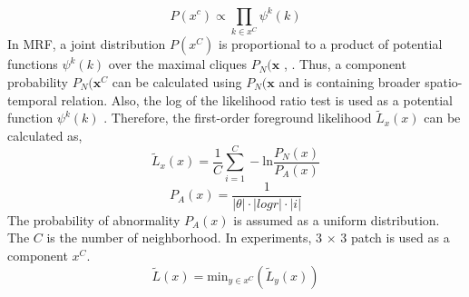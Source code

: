 \documentclass[conference]{IEEEtran}
\begin{document}
\begin{equation}\label{eq:90}
  P(x^c) \propto \prod_{k \in x^C} \psi ^k (k)
\end{equation}
In MRF, a joint distribution \begin{math} P(x^C) \end{math}  is proportional to a product of potential functions \begin{math} \psi^k(k) \end{math}  over the maximal cliques \begin{math} P_N(\mathbf{x} \end{math} , \cite{Bishop}. Thus, a component probability \begin{math} P_N(\mathbf{x}^C \end{math}  can be calculated using \begin{math} P_N(\mathbf{x} \end{math}  and is containing broader spatio-temporal relation. Also, the log of the likelihood ratio test \cite{Sheikh} is used as a potential function \begin{math} \psi^k(k) \end{math} . Therefore, the first-order foreground likelihood \begin{math} \tilde{L}_x(x) \end{math} can be calculated as,
\begin{equation}\label{eq:100}
  \tilde{L}_x(x) = \frac{1}{C} \sum_{i=1}^C - \textrm{ln} \frac{P_N(x)} {P_A(x)}
\end{equation}
\begin{equation}\label{eq:110}
  P_A(x) = \frac{1}{| \theta | \cdot |logr| \cdot |i|}
\end{equation}
The probability of abnormality \begin{math} P_A(x) \end{math} is assumed as a uniform distribution. The \begin{math} C \end{math} is the number of neighborhood. In experiments, 3 \begin{math} \times \end{math} 3 patch is used as a component \begin{math} x^C \end{math}. 
\begin{equation}\label{eq:120}
  \tilde{L}(x) = \textrm{min}_{y \in x^C}  (\tilde{L}_y(x))
\end{equation}
\end{document}
